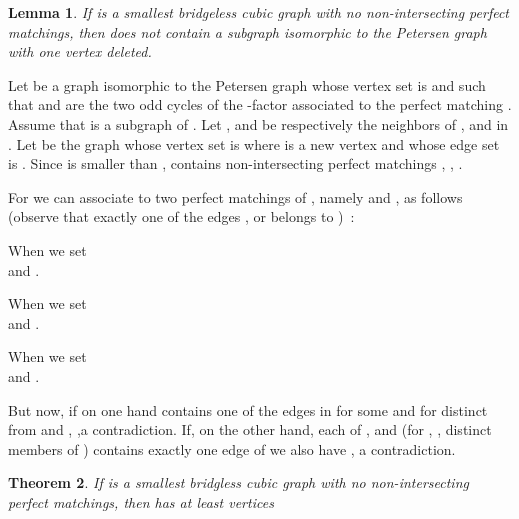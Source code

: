 \documentclass{elsart}
\theoremstyle{plain} \theoremheaderfont{\scshape}
\newtheorem{Thm}{\bf Theorem}
\newtheorem{Lem}[Thm]{\bf Lemma}
\newenvironment{Prf}{{\bf \noindent Proof } }{\hfill\\}
\begin{document}
\begin{Lem}\label{Lemma:P-vExcluded}  If  is a smallest bridgeless
cubic graph with no  non-intersecting perfect matchings, then 
does not contain a subgraph isomorphic to the Petersen graph with
one vertex deleted.
\end{Lem}
\begin{Prf}
Let  be a graph isomorphic to the Petersen graph whose vertex set
is  and such that  and  are
the two odd cycles of the -factor associated to the perfect
matching . Assume that  is a subgraph
of . Let ,  and  be respectively the neighbors of
,  and  in . Let  be the graph whose vertex set is
 where  is a new vertex and whose
edge set is . Since  is smaller
than ,  contains  non-intersecting perfect matchings
, , .

For  we can associate to  two perfect matchings
of  , namely  and , as follows (observe that exactly
one of the edges ,  or  belongs to )~:
\begin{description}
\item When  we set  \\and .
\item When  we set  \\ and .
\item When  we set  \\ and .
\end{description}
But now, if on one hand  contains one of the edges in
  for some  and  for  distinct from  and , ,a contradiction. If, on
the other hand, each of ,  and  (for , , 
distinct members of ) contains exactly one edge of
 we also have , a contradiction.
\end{Prf}
\begin{Thm} \label{Theorem:MinimumCounterExample32}
If  is a smallest bridgless cubic graph with no 
non-intersecting perfect matchings, then  has at least 
vertices
\end{Thm}
\end{document}

